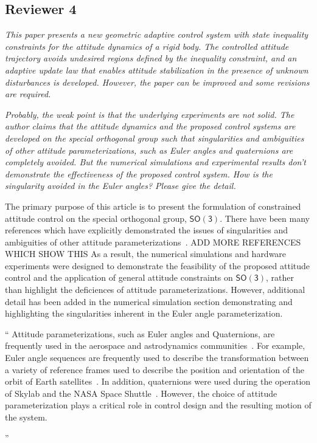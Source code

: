 \documentclass[11pt]{article}
\newcommand{\SO}{\ensuremath{\mathsf{SO(3)}}}
\newenvironment{correction}{\begin{list}{}{\setlength{\leftmargin}{1cm}\setlength{\rightmargin}{1cm}}\vspace{\parsep}\item[]``}{''\end{list}}
\begin{document}
\subsection*{Reviewer 4}
\textit{This paper presents a new geometric adaptive control system with state inequality constraints for the attitude dynamics of a rigid body. The controlled attitude trajectory avoids undesired regions defined by the inequality constraint, and an adaptive update law that enables attitude stabilization in the presence of unknown disturbances is developed. However, the paper can be improved and some revisions are required.}

\begin{enumerate}
\item \textit{Probably, the weak point is that the underlying experiments are not solid. The author claims that the attitude dynamics and the proposed control systems are developed on the special orthogonal group such that singularities and ambiguities of other attitude parameterizations, such as Euler angles and quaternions are completely avoided.  But the numerical simulations and experimental results don't demonstrate the effectiveness of the proposed control system. How is the singularity avoided in the Euler angles? Please give the detail.}

The primary purpose of this article is to present the formulation of constrained attitude control on the special orthogonal group, \( \SO \).
There have been many references which have explicitly demonstrated the issues of singularities and ambiguities of other attitude parameterizations~\cite{chaturvedi2011a,bhat2000,hughes2004}.
{\large ADD MORE REFERENCES WHICH SHOW THIS} 
As a result, the numerical simulations and hardware experiments were designed to demonstrate the feasibility of the proposed attitude control and the application of general attitude constraints on \( \SO \), rather than highlight the deficiences of attitude parameterizations.
However, additional detail has been added in the numerical simulation section demonstrating and highlighting the singularities inherent in the Euler angle parameterization.

\begin{correction}
Attitude parameterizations, such as Euler angles and Quaternions, are frequently used in the aerospace and astrodynamics communities~\cite{vallado2001,bate1971,wertz1978}.
For example, Euler angle sequences are frequently used to describe the transformation between a variety of reference frames used to describe the position and orientation of the orbit of Earth satellites~\cite{vallado2001}.
In addition, quaternions were used during the operation of Skylab and the NASA Space Shuttle~\cite{hughes2004}.
However, the choice of attitude parameterization plays a critical role in control design and the resulting motion of the system.


\end{correction}
\end{enumerate}
\end{document}
